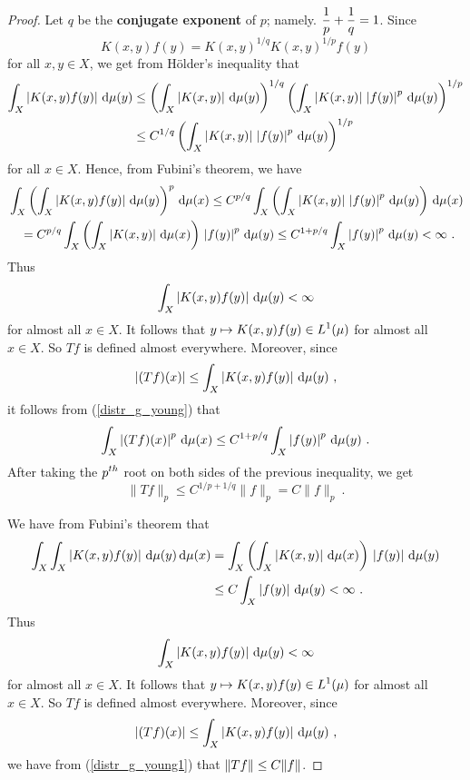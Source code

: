 \begin{proof}
  Let $q$ be the
{\bfseries conjugate exponent} of
$p$; namely. $\displaystyle \frac{1}{p} + \frac{1}{q} = 1$.  Since
\[
K(x,y)f(y) = K(x,y)^{1/q} K(x,y)^{1/p}f(y)
\]
for all $x,y \in X$, we get from Hölder's inequality that
\begin{align*}
\int_X \left| K(x,y)f(y)\right| \,\mathrm{d}{\mu(y)}
&\leq \left( \int_X \left| K(x,y)\right| \,\mathrm{d}{\mu(y)}\right)^{1/q}
\left(\int_X \left| K(x,y)\right|\,\left|f(y)\right|^p
\,\mathrm{d}{\mu(y)}\right)^{1/p} \\
& \leq C^{1/q} 
\left(\int_X \left| K(x,y)\right|\,\left|f(y)\right|^p
\,\mathrm{d}{\mu(y)}\right)^{1/p}
\end{align*}
for all $x \in X$.  Hence, from Fubini's theorem, we have
\begin{align}
&\int_X \left( \int_X \left| K(x,y)f(y)\right| \,\mathrm{d}{\mu(y)} \right)^p \,\mathrm{d}{\mu(x)}
\leq C^{p/q} \int_X \left(\int_X \left| K(x,y)\right|\,\left|f(y)\right|^p
\,\mathrm{d}{\mu(y)}\right) \,\mathrm{d}{\mu(x)} \nonumber \\
& \quad = C^{p/q} \int_X \left(\int_X \left| K(x,y)\right| \,\mathrm{d}{\mu(x)}\right)
\,\left|f(y)\right|^p \,\mathrm{d}{\mu(y)}
\leq C^{1+p/q} \int_X \left|f(y)\right|^p \,\mathrm{d}{\mu(y)} < \infty \  .
\label{distr_g_young}
\end{align}
Thus
\[
\int_X \left| K(x,y)f(y)\right| \,\mathrm{d}{\mu(y)} < \infty
\]
for almost all $x\in X$.  It follows that
$\displaystyle y \mapsto K(x,y)f(y) \in L^1(\mu)$ for almost all $x\in X$.
So $Tf$ is defined almost everywhere.  Moreover, since
\[
\left|(Tf)(x)\right| \leq \int_X \left| K(x,y)f(y)\right| \,\mathrm{d}{\mu(y)} \ ,
\]
it follows from (\ref{distr_g_young}) that
\[
\int_X \left|(Tf)(x)\right|^p \,\mathrm{d}{\mu(x)} \leq
C^{1+p/q} \int_X \left|f(y)\right|^p \,\mathrm{d}{\mu(y)} \ .
\]
After taking the $\displaystyle p^{th}$ root on both sides of the previous
inequality, we get
\[
\| Tf\|_p \leq C^{1/p+1/q} \| f\|_p = C \|f \|_p \ .
\]

  We have from Fubini's theorem that
\begin{align}
\int_X \int_X \left| K(x,y)f(y)\right| \,\mathrm{d}{\mu(y)} \,\mathrm{d}{\mu(x)}
& = \int_X \left(\int_X \left| K(x,y)\right| \,\mathrm{d}{\mu(x)}\right)
\,\left|f(y)\right| \,\mathrm{d}{\mu(y)} \nonumber \\
& \leq C \int_X \left|f(y)\right|\,\mathrm{d}{\mu(y)} < \infty \ .
\label{distr_g_young1}
\end{align}
Thus
\[
\int_X \left| K(x,y)f(y)\right| \,\mathrm{d}{\mu(y)} < \infty
\]
for almost all $x\in X$.
It follows that $\displaystyle y \mapsto K(x,y)f(y) \in L^1(\mu)$ for
almost all $x\in X$.  So $Tf$ is defined almost everywhere.  Moreover, since
\[
\left|(Tf)(x)\right| \leq \int_X \left| K(x,y)f(y)\right| \,\mathrm{d}{\mu(y)} \ ,
\]
we have from (\ref{distr_g_young1}) that
$\displaystyle \| Tf\| \leq  C \|f \|$.


\end{proof}
